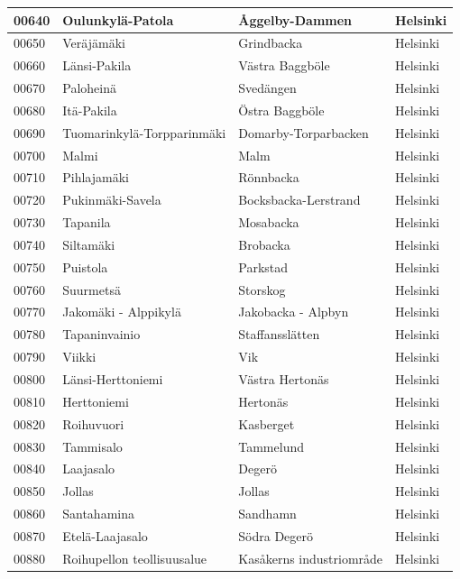 \begin{longtable}{llll}
    00640 & Oulunkylä-Patola & Åggelby-Dammen & Helsinki \\ [0.25ex] \hline
    00650 & Veräjämäki & Grindbacka & Helsinki \\ [0.25ex] \hline
    00660 & Länsi-Pakila & Västra Baggböle & Helsinki \\ [0.25ex] \hline
    00670 & Paloheinä & Svedängen & Helsinki \\ [0.25ex] \hline
    00680 & Itä-Pakila & Östra Baggböle & Helsinki \\ [0.25ex] \hline
    00690 & Tuomarinkylä-Torpparinmäki & Domarby-Torparbacken & Helsinki \\ [0.25ex] \hline
    00700 & Malmi & Malm & Helsinki \\ [0.25ex] \hline
    00710 & Pihlajamäki & Rönnbacka & Helsinki \\ [0.25ex] \hline
    00720 & Pukinmäki-Savela & Bocksbacka-Lerstrand & Helsinki \\ [0.25ex] \hline
    00730 & Tapanila & Mosabacka & Helsinki \\ [0.25ex] \hline
    00740 & Siltamäki & Brobacka & Helsinki \\ [0.25ex] \hline
    00750 & Puistola & Parkstad & Helsinki \\ [0.25ex] \hline
    00760 & Suurmetsä & Storskog & Helsinki \\ [0.25ex] \hline
    00770 & Jakomäki - Alppikylä & Jakobacka - Alpbyn & Helsinki \\ [0.25ex] \hline
    00780 & Tapaninvainio & Staffansslätten & Helsinki \\ [0.25ex] \hline
    00790 & Viikki & Vik & Helsinki \\ [0.25ex] \hline
    00800 & Länsi-Herttoniemi & Västra Hertonäs & Helsinki \\ [0.25ex] \hline
    00810 & Herttoniemi & Hertonäs & Helsinki \\ [0.25ex] \hline
    00820 & Roihuvuori & Kasberget & Helsinki \\ [0.25ex] \hline
    00830 & Tammisalo & Tammelund & Helsinki \\ [0.25ex] \hline
    00840 & Laajasalo & Degerö & Helsinki \\ [0.25ex] \hline
    00850 & Jollas & Jollas & Helsinki \\ [0.25ex] \hline
    00860 & Santahamina & Sandhamn & Helsinki \\ [0.25ex] \hline
    00870 & Etelä-Laajasalo & Södra Degerö & Helsinki \\ [0.25ex] \hline
    00880 & Roihupellon teollisuusalue & Kasåkerns industriområde & Helsinki \\ [0.25ex] \hline

\end{longtable}
